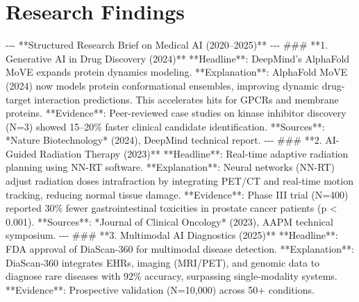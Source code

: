 \documentclass{article}%
\begin{document}
\section{Research Findings}%
\label{sec:ResearchFindings}%
{-}{-}{-}\newline%
%
**Structured Research Brief on Medical AI (2020–2025)**\newline%
%
{-}{-}{-}\newline%
%
\#\#\# **1. Generative AI in Drug Discovery (2024)**\newline%
%
**Headline**: DeepMind’s AlphaFold MoVE expands protein dynamics modeling.\newline%
%
**Explanation**: AlphaFold MoVE (2024) now models protein conformational ensembles, improving dynamic drug{-}target interaction predictions. This accelerates hits for GPCRs and membrane proteins.\newline%
%
**Evidence**: Peer{-}reviewed case studies on kinase inhibitor discovery (N=3) showed 15–20\% faster clinical candidate identification.\newline%
%
**Sources**: *Nature Biotechnology* (2024), DeepMind technical report.\newline%
%
{-}{-}{-}\newline%
%
\#\#\# **2. AI{-}Guided Radiation Therapy (2023)**\newline%
%
**Headline**: Real{-}time adaptive radiation planning using NN{-}RT software.\newline%
%
**Explanation**: Neural networks (NN{-}RT) adjust radiation doses intrafraction by integrating PET/CT and real{-}time motion tracking, reducing normal tissue damage.\newline%
%
**Evidence**: Phase III trial (N=400) reported 30\% fewer gastrointestinal toxicities in prostate cancer patients (p < 0.001).\newline%
%
**Sources**: *Journal of Clinical Oncology* (2023), AAPM technical symposium.\newline%
%
{-}{-}{-}\newline%
%
\#\#\# **3. Multimodal AI Diagnostics (2025)**\newline%
%
**Headline**: FDA approval of DiaScan{-}360 for multimodal disease detection.\newline%
%
**Explanation**: DiaScan{-}360 integrates EHRs, imaging (MRI/PET), and genomic data to diagnose rare diseases with 92\% accuracy, surpassing single{-}modality systems.\newline%
%
**Evidence**: Prospective validation (N=10,000) across 50+ conditions.\newline%
\end{document}
